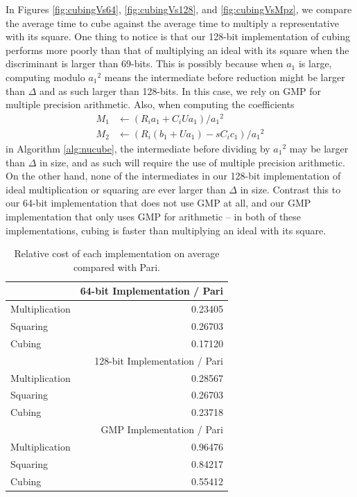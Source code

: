 \documentclass{ucalgthes1}
\theoremstyle{definition}
\begin{document}
In Figures \ref{fig:cubingVs64}, \ref{fig:cubingVs128}, and \ref{fig:cubingVsMpz}, we compare the average time to cube against the average time to multiply a representative with its square.  One thing to notice is that our 128-bit implementation of cubing performs more poorly than that of multiplying an ideal with its square when the discriminant is larger than 69-bits.  This is possibly because when $a_1$ is large, computing modulo ${a_1}^2$ means the intermediate before reduction might be larger than $\Delta$ and as such larger than 128-bits.  In this case, we rely on GMP for multiple precision arithmetic.  Also, when computing the coefficients 
\begin{align*}
M_1 &\gets (R_ia_1 + C_iUa_1) / {a_1}^2 \\
M_2 &\gets (R_i(b_1 + Ua_1) - sC_ic_1) / {a_1}^2
\end{align*}
in Algorithm \ref{alg:nucube}, the intermediate before dividing by ${a_1}^2$ may be larger than $\Delta$ in size, and as such will require the use of multiple precision arithmetic.  On the other hand, none of the intermediates in our 128-bit implementation of ideal multiplication or squaring are ever larger than $\Delta$ in size.  Contrast this to our 64-bit implementation that does not use GMP at all, and our GMP implementation that only uses GMP for arithmetic -- in both of these implementations, cubing is faster than multiplying an ideal with its square.


\begin{table}[htb]
\centering
\begin{tabular}{| l | r |}
	\hline
	           & 64-bit Implementation / Pari \\
	\hline
Multiplication & 0.23405 \\
Squaring       & 0.26703 \\
Cubing         & 0.17120 \\
	\hline
	\hline
	           & 128-bit Implementation / Pari \\
	\hline
Multiplication & 0.28567 \\
Squaring       & 0.26703 \\
Cubing         & 0.23718 \\
	\hline
	\hline
	           & GMP Implementation / Pari \\
	\hline
Multiplication & 0.96476 \\
Squaring       & 0.84217 \\
Cubing         & 0.55412 \\
	\hline
\end{tabular}
\caption[Relative Average Cost of Ideal Arithmetic.]{Relative cost of each implementation on average compared with Pari.}
\label{tab:relativeCostIdealArith}
\end{table}
\end{document}
